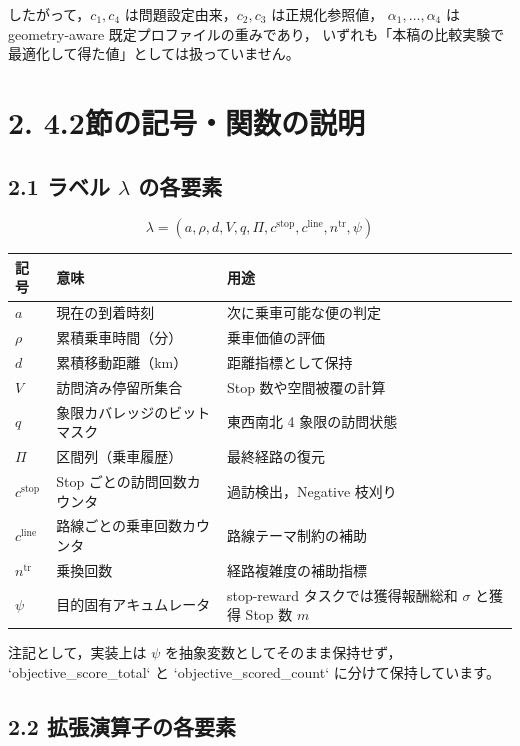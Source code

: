 \documentclass[a4paper,11pt]{article}
\begin{document}
したがって，$c_1,c_4$ は問題設定由来，$c_2,c_3$ は正規化参照値，
$\alpha_1,\ldots,\alpha_4$ は geometry-aware 既定プロファイルの重みであり，
いずれも「本稿の比較実験で最適化して得た値」としては扱っていません。

\section*{2. 4.2節の記号・関数の説明}

\subsection*{2.1 ラベル $\lambda$ の各要素}

\[
\lambda = \left(
a,\rho,d,V,q,\Pi,c^{\mathrm{stop}},c^{\mathrm{line}},n^{\mathrm{tr}},\psi
\right)
\]

\begin{tabularx}{\linewidth}{L{2.2cm}L{4.3cm}X}
\toprule
記号 & 意味 & 用途 \\
\midrule
$a$ & 現在の到着時刻 & 次に乗車可能な便の判定 \\
$\rho$ & 累積乗車時間（分） & 乗車価値の評価 \\
$d$ & 累積移動距離（km） & 距離指標として保持 \\
$V$ & 訪問済み停留所集合 & Stop 数や空間被覆の計算 \\
$q$ & 象限カバレッジのビットマスク & 東西南北 4 象限の訪問状態 \\
$\Pi$ & 区間列（乗車履歴） & 最終経路の復元 \\
$c^{\mathrm{stop}}$ & Stop ごとの訪問回数カウンタ & 過訪検出，Negative 枝刈り \\
$c^{\mathrm{line}}$ & 路線ごとの乗車回数カウンタ & 路線テーマ制約の補助 \\
$n^{\mathrm{tr}}$ & 乗換回数 & 経路複雑度の補助指標 \\
$\psi$ & 目的固有アキュムレータ & stop-reward タスクでは獲得報酬総和 $\sigma$ と獲得 Stop 数 $m$ \\
\bottomrule
\end{tabularx}

注記として，実装上は $\psi$ を抽象変数としてそのまま保持せず，
`objective\_score\_total` と `objective\_scored\_count` に分けて保持しています。

\subsection*{2.2 拡張演算子の各要素}
\end{document}
